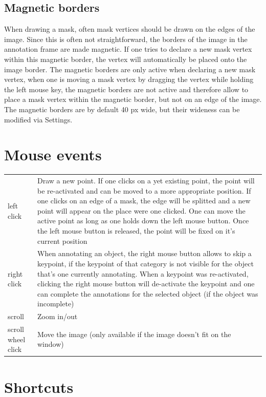 \documentclass[a4paper, 11pt]{article}
\begin{document}
\subsection{Magnetic borders}
When drawing a mask, often mask vertices should be drawn on the edges of the image. Since this is often not straightforward, the borders of the image in the annotation frame are made magnetic. If one tries to declare a new mask vertex within this magnetic border, the vertex will automatically be placed onto the image border. The magnetic borders are only active when declaring a new mask vertex, when one is moving a mask vertex by dragging the vertex while holding the left mouse key, the magnetic borders are not active and therefore allow to place a mask vertex within the magnetic border, but not on an edge of the image. The magnetic borders are by default 40 px wide, but their wideness can be modified via Settings.

\section{Mouse events}

\begin{tabular}{ p{3cm} p{14cm}}
	left click & Draw a new point. If one clicks on a yet existing point, the point will be re-activated and can be moved to a more appropriate position. If one clicks on an edge of a mask, the edge will be splitted and a new point will appear on the place were one clicked. One can move the active point as long as one holds down the left mouse button. Once the left mouse button is released, the point will be fixed on it's current position\\
	right click & When annotating an object, the right mouse button allows to skip a keypoint, if the keypoint of that category is not visible for the object that's one currently annotating. When a keypoint was re-activated, clicking the right mouse button will de-activate the keypoint and one can complete the annotations for the selected object (if the object was incomplete)\\
	scroll & Zoom in/out \\  
	scroll wheel click & Move the image (only available if the image doesn't fit on the window)     
\end{tabular}


\section{Shortcuts}
\end{document}
